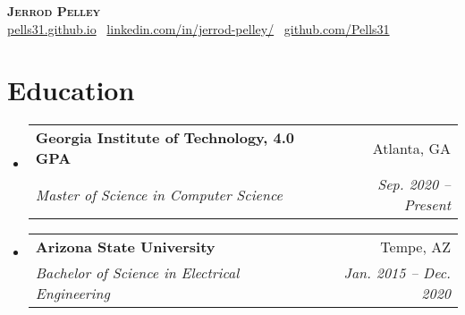 \documentclass[letterpaper,11pt]{article}
\makeatletter
\newcommand{\resumeSubheading}[4]{
  \vspace{-2pt}\item
    \begin{tabular*}{0.97\textwidth}[t]{l@{\extracolsep{\fill}}r}
      \textbf{#1} & #2 \\
      \textit{\small#3} & \textit{\small #4} \\
    \end{tabular*}\vspace{-7pt}
}
\newcommand{\resumeSubHeadingListStart}{\begin{itemize}[leftmargin=0.15in, label={}]}
\newcommand{\resumeSubHeadingListEnd}{\end{itemize}}
\makeatother
\begin{document}

\begin{center}
    \textbf{\Huge \scshape Jerrod Pelley} \\ \vspace{10pt}
    \href{https://pells31.github.io/}{pells31.github.io} \linebreak
    \faLinkedin \, \href{http://linkedin.com/in/jerrod-pelley}{linkedin.com/in/jerrod-pelley/} \hspace{10pt}
    \faGithub \, \href{https://github.com/Pells31}{github.com/Pells31}\linebreak
    \address{} \hspace{10pt}
     \hspace{10pt}
    \address{}
\end{center}


\section{Education}
  \resumeSubHeadingListStart
    \resumeSubheading
      {Georgia Institute of Technology, 4.0 GPA}{Atlanta, GA}
      {Master of Science in Computer Science}{Sep. 2020 -- Present}
    \resumeSubheading
      {Arizona State University}{Tempe, AZ}
      {Bachelor of Science in Electrical Engineering}{Jan. 2015 -- Dec. 2020}
  \resumeSubHeadingListEnd

\end{document}
